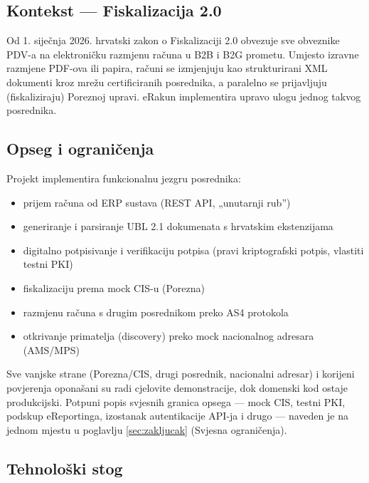 \documentclass[11pt,a4paper]{article}
\begin{document}
\subsection{Kontekst — Fiskalizacija 2.0}

Od 1. siječnja 2026. hrvatski zakon o Fiskalizaciji 2.0 obvezuje sve obveznike
PDV-a na elektroničku razmjenu računa u B2B i B2G prometu. Umjesto izravne razmjene
PDF-ova ili papira, računi se izmjenjuju kao strukturirani XML dokumenti kroz mrežu
certificiranih posrednika, a paralelno se prijavljuju (fiskaliziraju) Poreznoj
upravi. eRakun implementira upravo ulogu jednog takvog posrednika.

\subsection{Opseg i ograničenja}\label{sec:opseg}

Projekt implementira funkcionalnu jezgru posrednika:

\begin{itemize}[nosep]
  \item prijem računa od ERP sustava (REST API, „unutarnji rub”)
  \item generiranje i parsiranje UBL 2.1 dokumenata s hrvatskim ekstenzijama
  \item digitalno potpisivanje i verifikaciju potpisa (pravi kriptografski potpis,
        vlastiti testni PKI)
  \item fiskalizaciju prema mock CIS-u (Porezna)
  \item razmjenu računa s drugim posrednikom preko AS4 protokola
  \item otkrivanje primatelja (discovery) preko mock nacionalnog adresara (AMS/MPS)
\end{itemize}

Sve vanjske strane (Porezna/CIS, drugi posrednik, nacionalni adresar) i korijeni
povjerenja oponašani su radi cjelovite demonstracije, dok domenski kod ostaje
produkcijski. Potpuni popis svjesnih granica opsega — mock CIS, testni PKI, podskup
eReportinga, izostanak autentikacije API-ja i drugo — naveden je na jednom mjestu u
poglavlju \ref{sec:zakljucak} (Svjesna ograničenja).

\subsection{Tehnološki stog}
\end{document}
